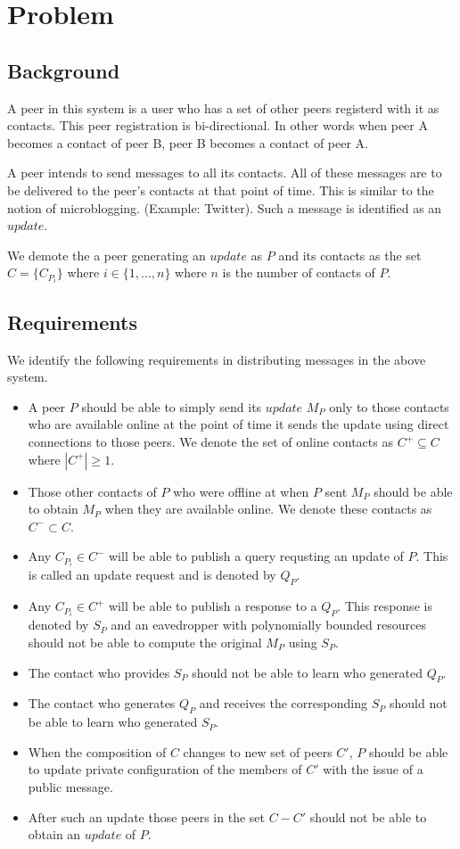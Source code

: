 \section{Problem}


\subsection{Background}
A peer in this system is a user who has a set of other peers registerd with it as contacts. This peer registration is bi-directional. In other words when peer A becomes a contact of peer B, peer B becomes a contact of peer A. 

A peer intends to send messages to all its contacts. All of these messages are to be delivered to the peer's contacts at that point of time. This is similar to the notion of microblogging. (Example: Twitter\cite{twitter}). Such a message is identified as an $update$.

We demote the a peer generating an $update$ as $P$ and its contacts as the set $C = \{C_{P_i}\}$ where $i \in \{1 , ..., n\}$ where $n$ is the number of contacts of $P$.

\subsection{Requirements}
We identify the following requirements in distributing messages in the above system.
\begin{itemize}
	\item A peer $P$ should be able to simply send its $update$ $M_P$ only to those contacts who are available online at the point of time it sends the update using direct connections to those peers. We denote the set of online contacts as  ${C^+} \subseteq C$ where $|{C^+}| \geq 1$.
	\item Those other contacts of $P$ who were offline at when $P$ sent $M_P$ should be able to obtain $M_P$ when they are available online. We denote these contacts as ${C^-} \subset C$.
	\item Any $C_{P_i} \in C^-$ will be able to publish a query requsting an update of $P$. This is called an update request and is denoted by $Q_P$.
	\item Any  $C_{P_i} \in C^+$ will be able to publish a response to a $Q_P$. This response is denoted by $S_P$ and an eavedropper with polynomially bounded resources should not be able to compute the original $M_P$ using $S_P$.
	\item The contact who provides $S_P$ should not be able to learn who generated $Q_P$.
	\item The contact who generates $Q_P$ and receives the corresponding $S_P$ should not be able to learn who generated $S_P$.
	\item When the composition of $C$ changes to new set of peers $C'$, $P$ should be able to update private configuration of the members of $C'$ with the issue of a public message.
	\item After such an update those peers in the set $C - C'$ should not be able to obtain an $update$ of $P$.
\end{itemize}

